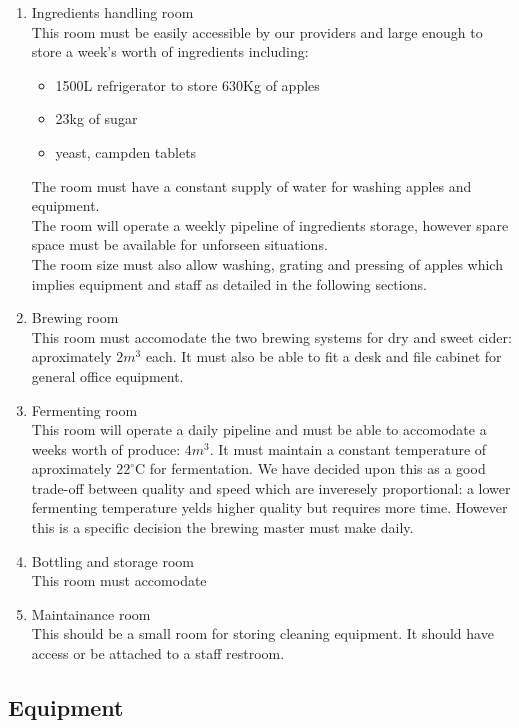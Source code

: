 \documentclass{article}
\begin{document}
  \begin{enumerate}
  \item Ingredients handling room \\
  This room must be easily accessible by our providers and large enough to store a week's worth of ingredients including: \\
    \begin{itemize}
    \item 1500L refrigerator to store 630Kg of apples
    \item 23kg of sugar
    \item yeast, campden tablets
    \end{itemize}
  The room must have a constant supply of water for washing apples and equipment. \\
  The room will operate a weekly pipeline of ingredients storage, however spare space must be available for unforseen situations.\\
  The room size must also allow washing, grating and pressing of apples which implies equipment and staff as detailed in the following sections.

  \item Brewing room \\
  This room must accomodate the two brewing systems for dry and sweet cider: aproximately $2m^3$ each. It must also be able to fit a desk and file cabinet for general office equipment.
  \item Fermenting room \\
  This room will operate a daily pipeline and must be able to accomodate a weeks worth of produce: $4m^3$. It must maintain a constant temperature of aproximately $22^\circ$C for fermentation. We have decided upon this as a good trade-off between quality and speed which are inveresely proportional: a lower fermenting temperature yelds higher quality but requires more time. However this is a specific decision the brewing master must make daily.

  \item Bottling and storage room \\
  This room must accomodate

  \item Maintainance room\\
  This should be a small room for storing cleaning equipment. It should have access or be attached to a staff restroom.
  \end{enumerate}

  \subsection{Equipment}
\end{document}
